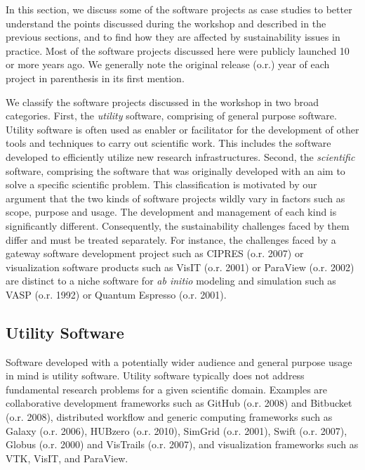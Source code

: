 \documentclass[11pt, oneside]{amsart}
\newcommand{\note}[1]{ {\textcolor{red}    { #1 }}}
\newcommand{\toolname}[1] {\textsf{#1}}
\begin{document}
In this section, we discuss some of the software projects as case
studies to better understand the points discussed during the workshop
and described in the previous sections, and to find how 
they are affected by sustainability issues in
practice. 
%
Most of the software projects discussed here were publicly launched 10
or more years ago. We generally note the original release (o.r.) year of each project in 
parenthesis in its first mention.

We classify the software projects discussed in the workshop in two
broad categories. First, the \emph{utility} software, comprising of
general purpose software. Utility software is often used as enabler
or facilitator for the development of other tools and techniques
to carry out scientific work. This includes the software developed to
efficiently utilize new research infrastructures. Second, the
\emph{scientific} software, comprising the software that was
originally developed with an aim to solve a specific scientific
problem.
%
This classification is motivated by our argument that the two kinds of software
projects wildly vary in factors such as scope, purpose and usage. The
development and management of each kind is significantly different.
Consequently, the sustainability challenges faced by them differ and must be
treated separately. For instance, the challenges faced by a gateway software
development project such as \toolname{CIPRES} (o.r. 2007) or visualization software
products such as \toolname{VisIT (o.r. 2001)} or \toolname{ParaView} (o.r.  2002) are
distinct to a niche software for \textit{ab initio} modeling and simulation
such as \toolname{VASP} (o.r. 1992) or \toolname{Quantum Espresso} (o.r. 2001). %

\subsection{Utility Software}
Software developed with a potentially wider audience and general purpose usage
in mind is utility software. Utility software typically does not address
fundamental research problems for a given scientific domain. Examples are
collaborative development frameworks such as \toolname{GitHub} (o.r. 2008) and
\toolname{Bitbucket} (o.r.  2008), distributed workflow and generic computing
frameworks such as \toolname{Galaxy} (o.r. 2006), \toolname{HUBzero} (o.r. 2010),
\toolname{SimGrid} (o.r. 2001), \toolname{Swift} (o.r. 2007), \toolname{Globus} (o.r. 2000) and
\toolname{VisTrails} (o.r. 2007), and visualization frameworks such as \toolname{VTK},
\toolname{VisIT}, and \toolname{ParaView}.
\end{document}
